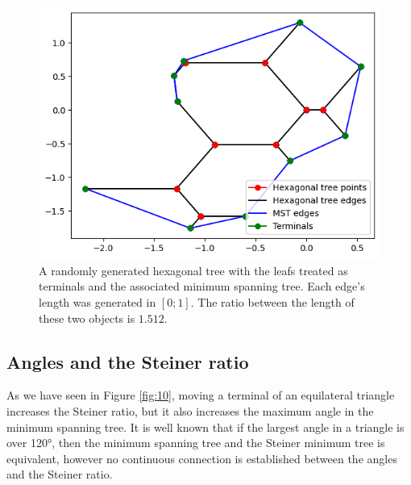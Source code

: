 \documentclass{mpaper}
\begin{document}
\begin{figure}[h!]
  \begin{center}
  \includegraphics[scale=0.5]{plot15.png}
  \end{center}
  \caption{\label{fig:17} A randomly generated hexagonal tree with the leafs treated as terminals and the associated minimum spanning tree. Each edge's length was generated in $[0;1]$. The ratio between the length of these two objects is $1.512$.}
\end{figure}

\subsection{Angles and the Steiner ratio}

As we have seen in Figure \ref{fig:10}, moving a terminal of an equilateral triangle increases the Steiner ratio, but it also increases the maximum angle in the minimum spanning tree. It is well known that if the largest angle in a triangle is over 120°, then the minimum spanning tree and the Steiner minimum tree is equivalent, however no  continuous connection is established between the angles and the Steiner ratio.
\end{document}
